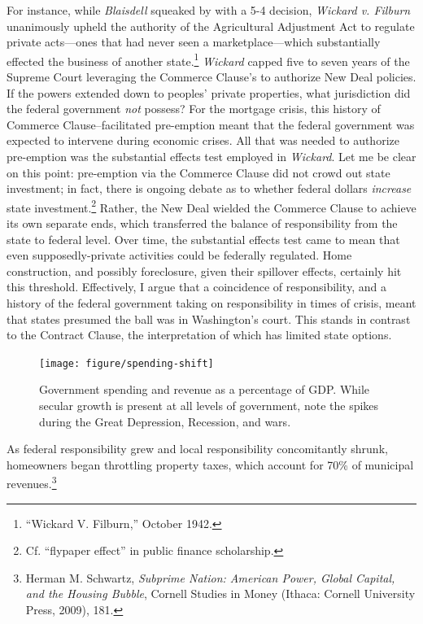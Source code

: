 \documentclass[12pt,oneside]{psthesis}
\begin{document}
For instance, while \emph{Blaisdell} squeaked by with a 5-4 decision, \emph{Wickard v. Filburn} unanimously upheld the authority of the Agricultural Adjustment Act to regulate private acts---ones that had never seen a marketplace---which substantially effected the business of another state.\footnote{``Wickard V. Filburn,'' October 1942.}
\emph{Wickard} capped five to seven years of the Supreme Court leveraging the Commerce Clause's to authorize New Deal policies.
If the powers extended down to peoples' private properties, what jurisdiction did the federal government \emph{not} possess?
For the mortgage crisis, this history of Commerce Clause--facilitated pre-emption meant that the federal government was expected to intervene during economic crises.
All that was needed to authorize pre-emption was the substantial effects test employed in \emph{Wickard}.
Let me be clear on this point: pre-emption via the Commerce Clause did not crowd out state investment; in fact, there is ongoing debate as to whether federal dollars \emph{increase} state investment.\footnote{Cf. ``flypaper effect'' in public finance scholarship.}
Rather, the New Deal wielded the Commerce Clause to achieve its own separate ends, which transferred the balance of responsibility from the state to federal level.
Over time, the substantial effects test came to mean that even supposedly-private activities could be federally regulated.
Home construction, and possibly foreclosure, given their spillover effects, certainly hit this threshold.
Effectively, I argue that a coincidence of responsibility, and a history of the federal government taking on responsibility in times of crisis, meant that states presumed the ball was in Washington's court.
This stands in contrast to the Contract Clause, the interpretation of which has limited state options.
\begin{figure}

{\centering \texttt{[image: figure/spending-shift]} 

}

\caption{Government spending and revenue as a percentage of GDP. While secular growth is present at all levels of government, note the spikes during the Great Depression, Recession, and wars.}\label{fig:spending-shift}
\end{figure}
As federal responsibility grew and local responsibility concomitantly shrunk, homeowners began throttling property taxes, which account for 70\% of municipal revenues.\footnote{Herman M. Schwartz, \emph{Subprime Nation: American Power, Global Capital, and the Housing Bubble}, Cornell Studies in Money (Ithaca: Cornell University Press, 2009), 181.}
\end{document}

